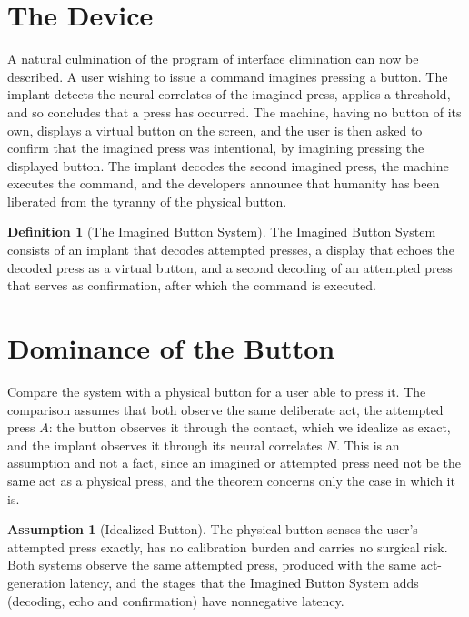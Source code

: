 \documentclass[11pt,twoside,openany]{book}
\theoremstyle{definition}
\newtheorem{definition}[theorem]{Definition}
\newtheorem{assumption}[theorem]{Assumption}
\theoremstyle{remark}
\begin{document}
\section{The Device}

A natural culmination of the program of interface elimination can now be described. A user wishing to issue a command imagines pressing a button. The implant detects the neural correlates of the imagined press, applies a threshold, and so concludes that a press has occurred. The machine, having no button of its own, displays a virtual button on the screen, and the user is then asked to confirm that the imagined press was intentional, by imagining pressing the displayed button. The implant decodes the second imagined press, the machine executes the command, and the developers announce that humanity has been liberated from the tyranny of the physical button.

\begin{definition}[The Imagined Button System]
The Imagined Button System consists of an implant that decodes attempted presses, a display that echoes the decoded press as a virtual button, and a second decoding of an attempted press that serves as confirmation, after which the command is executed.
\end{definition}

\section{Dominance of the Button}

Compare the system with a physical button for a user able to press it. The comparison assumes that both observe the same deliberate act, the attempted press $A$: the button observes it through the contact, which we idealize as exact, and the implant observes it through its neural correlates $N$. This is an assumption and not a fact, since an imagined or attempted press need not be the same act as a physical press, and the theorem concerns only the case in which it is.

\begin{assumption}[Idealized Button]\label{as:ideal}
The physical button senses the user's attempted press exactly, has no calibration burden and carries no surgical risk. Both systems observe the same attempted press, produced with the same act-generation latency, and the stages that the Imagined Button System adds (decoding, echo and confirmation) have nonnegative latency.
\end{assumption}
\end{document}
